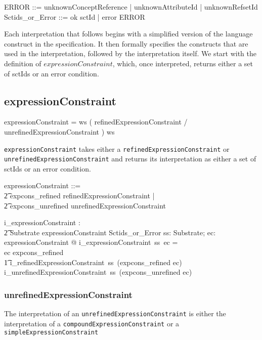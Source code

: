 \documentclass{article}
\def\spec#1{{\tt #1}}
\def\bnf#1{{\scriptsize {{#1}} }}
\begin{document}
\begin{zed}  
ERROR ::= unknownConceptReference | unknownAttributeId | unknownRefsetId 
\also
Sctids\_or\_Error ::= ok \ldata \power sctId \rdata | error \ldata ERROR \rdata 
\end{zed}



Each interpretation that follows begins with a simplified version
of the language construct in the specification.  It then formally specifies the constructs that are used in the interpretation, followed by the interpretation itself. We start with the definition 
of $expressionConstraint$, which, once interpreted, returns either a set of sctIds or an error condition.
\subsection{expressionConstraint}
\begin{framed}
\noindent
\bnf{expressionConstraint = ws ( refinedExpressionConstraint / unrefinedExpressionConstraint ) ws}
\end{framed}

\spec{expressionConstraint} takes either a \spec{refinedExpressionConstraint} or \\ \spec{unrefinedExpressionConstraint} and returns its interpretation as either a set of sctIds or an error condition.
\begin{zed}
expressionConstraint ::= \\
\t2 expcons\_refined \ldata refinedExpressionConstraint \rdata | \\
\t2 expcons\_unrefined \ldata unrefinedExpressionConstraint \rdata \\
\end{zed}


\begin{gendef}
   i\_expressionConstraint : \\
\t2 Substrate \fun expressionConstraint \fun Sctids\_or\_Error
\where
   \forall ss: Substrate; ec: expressionConstraint @ i\_expressionConstraint~ss~ec = \\
   \IF ec \in \ran expcons\_refined  \\
\t1 \THEN i\_refinedExpressionConstraint~ss~(expcons\_refined \inv ec) \\
   \ELSE i\_unrefinedExpressionConstraint~ss~(expcons\_unrefined \inv ec) 
\end{gendef}

\subsubsection{unrefinedExpressionConstraint}
The interpretation of an \spec{unrefinedExpressionConstraint} is either the interpretation of a \spec{compoundExpressionConstraint} or a \spec{simpleExpressionConstraint}
\end{document}

